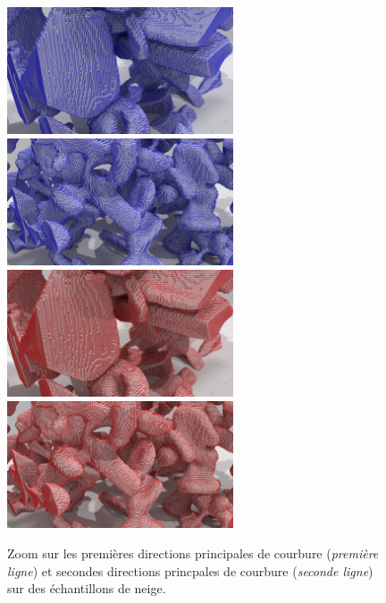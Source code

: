 \begin{figure}[ht]
    \begin{center}
    \includegraphics[trim={17cm 0 13cm 0},clip,width=6.7cm]{images/digitalSnow/E2bis-prindir-bleu}
		\includegraphics[trim={17cm 0 13cm 0},clip,width=6.7cm]{images/digitalSnow/I08prindir}\\
		\includegraphics[trim={17cm 0 13cm 0},clip,width=6.7cm]{images/digitalSnow/E2bis-prindir-rouge}
    \includegraphics[trim={17cm 0 13cm 0},clip,width=6.7cm]{images/digitalSnow/I08prindir2}
    \end{center}
    \caption{Zoom sur les premières directions principales de courbure
    (\emph{première ligne}) et secondes directions princpales de courbure
    (\emph{seconde ligne}) sur des échantillons de neige.
    \label{fig:digitalSnow-princdir}}
\end{figure}

